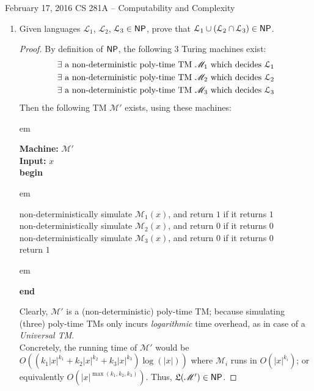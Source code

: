 \documentclass[usletter]{article}
\newcommand {\langset}[1]      {\ensuremath{\mathcal{#1}}}
\newcommand {\machine}[1]      {\ensuremath{\mathscr{#1}}}
\newcommand {\langfunc}        {\ensuremath{\mathfrak{L}}}
\newcommand {\family}[1]       {\ensuremath{\textnormal{\textsf{#1}}}}
\newcommand {\term}[1]      {\textit{#1}}
\newcommand {\indpar}[1]   {
  \par\leftskip=#1em
  \noindent\ignorespaces
}
\newenvironment{turing}[2] {
  \smallskip
  \indpar{2}
  \textbf{Machine:} #1\\
  \textbf{Input:} $#2$\\[5pt]
  \textbf{begin}
  \parskip=0pt
  \indpar{3}
}{
  \indpar{2}
  \textbf{end}
  \par\medskip
}
\newcommand {\langL}          {\langset{L}}
\newcommand {\machineM}       {\machine{M}}
\begin{document}
 {February 17, 2016}
            {CS 281A -- Computability and Complexity}

\begin{enumerate}
  \item Given languages $\langL_1$, $\langL_2$, $\langL_3 \in \family{NP}$,
        prove that $\langL_1 \cup (\langL_2 \cap \langL_3) \in \family{NP}$.
  \begin{proof}
    By definition of \family{NP}, the following $3$ Turing machines exist:
    \begin{align}
      \label{q1_m1} \exists \textnormal{ a non-deterministic poly-time TM }
                      \machineM_1 \textnormal{ which decides } \langL_1 \\
      \label{q1_m2} \exists \textnormal{ a non-deterministic poly-time TM }
                      \machineM_2 \textnormal{ which decides } \langL_2 \\
      \label{q1_m3} \exists \textnormal{ a non-deterministic poly-time TM }
                      \machineM_3 \textnormal{ which decides } \langL_3
    \end{align}
    Then the following TM $\machineM'$ exists, using these machines:
    \begin{turing}{$\machineM'$}{x}
      non-deterministically simulate $\machineM_1(x)$,
        and return $1$ if it returns $1$ \\
      non-deterministically simulate $\machineM_2(x)$,
        and return $0$ if it returns $0$ \\
      non-deterministically simulate $\machineM_3(x)$,
        and return $0$ if it returns $0$ \\
      return $1$
    \end{turing}
    Clearly, $\machineM'$ is a (non-deterministic) poly-time TM;
    because simulating (three) poly-time TMs only incurs \textit{logarithmic}
    time overhead, as in case of a \term{Universal TM}. \\
    Concretely, the running time of $\machineM'$ would be
    $O((k_1 |x|^{k_1} + k_2 |x|^{k_2} + k_3 |x|^{k_3}) \log(|x|))$
    where $\machineM_i$ runs in $O(|x|^{k_i})$;
    or equivalently $O(|x|^{\max(k_1, k_2, k_3)})$.
    Thus, $\langfunc(\machineM') \in \family{NP}$.


\end{proof}
\end{enumerate}
\end{document}
